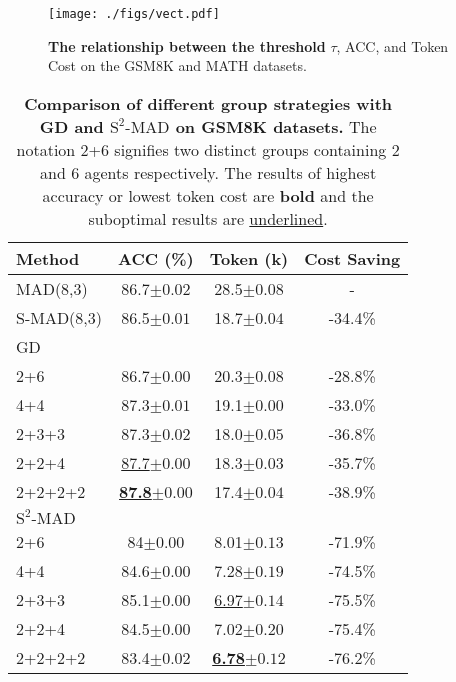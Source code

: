 \begin{figure}[t]
  \texttt{[image: ./figs/vect.pdf]}
    \caption{\textbf{The relationship between the threshold} $\tau$, ACC, and Token Cost on the GSM8K and MATH datasets.}
    \label{fig:vect}
    \vspace{-1.0 em}
\end{figure}


\begin{table}[h]
  \centering
  \setlength\tabcolsep{1.5 pt}
  \begin{tabular}{lccc}
    \toprule
    \textbf{Method} & \textbf{ACC (\%)} & \textbf{Token (k)} & \textbf{Cost Saving}\\ 
    \midrule
    MAD(8,3) & 86.7\scriptsize{$\pm 0.02$} & 28.5\scriptsize{$\pm 0.08$} & - \\
    S-MAD(8,3) & 86.5\scriptsize{$\pm 0.01$} & 18.7\scriptsize{$\pm 0.04$}  & -34.4\%\\
    \midrule
    GD & &\\
    \midrule
    2+6 & 86.7\scriptsize{$\pm 0.00$} & 20.3\scriptsize{$\pm 0.08$} & -28.8\%\\
    4+4 & 87.3\scriptsize{$\pm 0.01$} & 19.1\scriptsize{$\pm 0.00$}  & -33.0\%\\
    2+3+3 & 87.3\scriptsize{$\pm 0.02$} & 18.0\scriptsize{$\pm 0.05$} & -36.8\%\\
    2+2+4 & \underline{87.7}\scriptsize{$\pm 0.00$} & 18.3\scriptsize{$\pm 0.03$} & -35.7\%\\
    2+2+2+2 & \underline{\textbf{87.8}}\scriptsize{$\pm 0.00$} & 17.4\scriptsize{$\pm 0.04$} & -38.9\%\\
    \midrule
    \({\text{S}^2\text{-MAD}}\) & &\\
    \midrule
    2+6 & 84\scriptsize{$\pm 0.00$} & 8.01\scriptsize{$\pm 0.13$} & -71.9\%\\
    4+4 & 84.6\scriptsize{$\pm 0.00$} & 7.28\scriptsize{$\pm 0.19$} & -74.5\%\\
    2+3+3 & 85.1\scriptsize{$\pm 0.00$} & \underline{6.97}\scriptsize{$\pm 0.14$} & -75.5\%\\
    2+2+4 & 84.5\scriptsize{$\pm 0.00$} & 7.02\scriptsize{$\pm 0.20$} & -75.4\%\\
    2+2+2+2 & 83.4\scriptsize{$\pm 0.02$} & \underline{\textbf{6.78}}\scriptsize{$\pm 0.12$} & -76.2\%\\
    \bottomrule
    
  \end{tabular}
  \caption{\textbf{Comparison of different group strategies with GD and \({\text{S}^2\text{-MAD}}\) on GSM8K datasets.} The notation 2+6 signifies two distinct groups containing 2 and 6 agents respectively. The results of highest accuracy or lowest token cost are \textbf{bold} and the suboptimal results are \underline{underlined}.}
  \label{tab:comparison}
\end{table}

